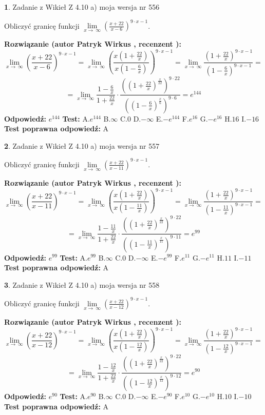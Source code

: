 \documentclass[12pt, a4paper]{article}
\theoremstyle{definition} %
\newtheorem{zad}{}
\newcommand{\zadStart}[1]{\begin{zad}#1\newline}
\newcommand{\zadStop}{\end{zad}}
\newcommand{\rozwStart}[2]{\noindent \textbf{Rozwiązanie (autor #1 , recenzent #2): }\newline}
\newcommand{\rozwStop}{\newline}
\newcommand{\odpStart}{\noindent \textbf{Odpowiedź:}\newline}
\newcommand{\odpStop}{\newline}
\newcommand{\testStart}{\noindent \textbf{Test:}\newline}
\newcommand{\testStop}{\newline}
\newcommand{\kluczStart}{\noindent \textbf{Test poprawna odpowiedź:}\newline}
\newcommand{\kluczStop}{\newline}
\begin{document}
\zadStart{Zadanie z Wikieł Z 4.10 a) moja wersja nr 556}

Obliczyć granicę funkcji  $\lim\limits_{x\to\ \infty}(\frac{x+22}{x-6})^{9\cdot x-1}$.
\zadStop
\rozwStart{Patryk Wirkus}{}
$$\lim\limits_{x\to\ \infty}(\frac{x+22}{x-6})^{9\cdot x-1} = \lim\limits_{x\to\ \infty}(\frac{x(1+\frac{22}{x})}{x(1-\frac{6}{x})})^{9\cdot x-1}=\lim\limits_{x\to\ \infty}\frac{(1+\frac{22}{x})^{9\cdot x-1}}{(1-\frac{6}{x})^{9\cdot x-1}}=$$
$$=\lim\limits_{x\to\ \infty}\frac{1-\frac{6}{x}}{1+\frac{22}{x}}\cdot\frac{((1+\frac{22}{x})^{\frac{x}{22}})^{9\cdot22}}{((1-\frac{6}{x})^{\frac{x}{6}})^{9\cdot6}}=e^{144}$$
\rozwStop
\odpStart
$e^{144}$
\odpStop
\testStart
A.$e^{144}$ B.$\infty$ C.$0$ D.$-\infty$ E.$-e^{144}$
F.$e^{16}$ G.$-e^{16}$
H.$16$
I.$-16$
\testStop
\kluczStart
A
\kluczStop



\zadStart{Zadanie z Wikieł Z 4.10 a) moja wersja nr 557}

Obliczyć granicę funkcji  $\lim\limits_{x\to\ \infty}(\frac{x+22}{x-11})^{9\cdot x-1}$.
\zadStop
\rozwStart{Patryk Wirkus}{}
$$\lim\limits_{x\to\ \infty}(\frac{x+22}{x-11})^{9\cdot x-1} = \lim\limits_{x\to\ \infty}(\frac{x(1+\frac{22}{x})}{x(1-\frac{11}{x})})^{9\cdot x-1}=\lim\limits_{x\to\ \infty}\frac{(1+\frac{22}{x})^{9\cdot x-1}}{(1-\frac{11}{x})^{9\cdot x-1}}=$$
$$=\lim\limits_{x\to\ \infty}\frac{1-\frac{11}{x}}{1+\frac{22}{x}}\cdot\frac{((1+\frac{22}{x})^{\frac{x}{22}})^{9\cdot22}}{((1-\frac{11}{x})^{\frac{x}{11}})^{9\cdot11}}=e^{99}$$
\rozwStop
\odpStart
$e^{99}$
\odpStop
\testStart
A.$e^{99}$ B.$\infty$ C.$0$ D.$-\infty$ E.$-e^{99}$
F.$e^{11}$ G.$-e^{11}$
H.$11$
I.$-11$
\testStop
\kluczStart
A
\kluczStop



\zadStart{Zadanie z Wikieł Z 4.10 a) moja wersja nr 558}

Obliczyć granicę funkcji  $\lim\limits_{x\to\ \infty}(\frac{x+22}{x-12})^{9\cdot x-1}$.
\zadStop
\rozwStart{Patryk Wirkus}{}
$$\lim\limits_{x\to\ \infty}(\frac{x+22}{x-12})^{9\cdot x-1} = \lim\limits_{x\to\ \infty}(\frac{x(1+\frac{22}{x})}{x(1-\frac{12}{x})})^{9\cdot x-1}=\lim\limits_{x\to\ \infty}\frac{(1+\frac{22}{x})^{9\cdot x-1}}{(1-\frac{12}{x})^{9\cdot x-1}}=$$
$$=\lim\limits_{x\to\ \infty}\frac{1-\frac{12}{x}}{1+\frac{22}{x}}\cdot\frac{((1+\frac{22}{x})^{\frac{x}{22}})^{9\cdot22}}{((1-\frac{12}{x})^{\frac{x}{12}})^{9\cdot12}}=e^{90}$$
\rozwStop
\odpStart
$e^{90}$
\odpStop
\testStart
A.$e^{90}$ B.$\infty$ C.$0$ D.$-\infty$ E.$-e^{90}$
F.$e^{10}$ G.$-e^{10}$
H.$10$
I.$-10$
\testStop
\kluczStart
A
\kluczStop
\end{document}
